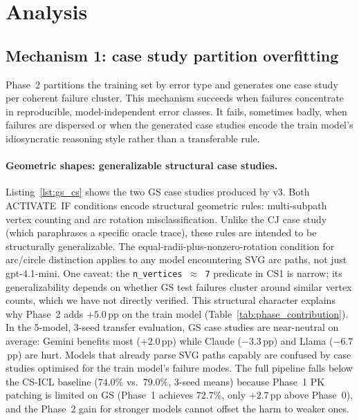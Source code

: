 \documentclass{article}
\begin{document}


\section{Analysis}
\label{sec:analysis}

\subsection{Mechanism 1: case study partition overfitting}
\label{sec:overfitting}

Phase~2 partitions the training set by error type and generates one case study per coherent
failure cluster.
This mechanism succeeds when failures concentrate in reproducible, model-independent error classes.
It fails, sometimes badly, when failures are dispersed or when the generated case studies encode
the train model's idiosyncratic reasoning style rather than a transferable rule.

\paragraph{Geometric shapes: generalizable structural case studies.}
Listing~\ref{lst:gs_cs} shows the two GS case studies produced by v3.
Both ACTIVATE~IF conditions encode structural geometric rules: multi-subpath vertex counting
and arc rotation misclassification.
Unlike the CJ case study (which paraphrases a specific oracle trace), these rules are
intended to be structurally generalizable. The equal-radii-plus-nonzero-rotation condition
for arc/circle distinction applies to any model encountering SVG arc paths, not just gpt-4.1-mini.
One caveat: the \texttt{n\_vertices $\approx$ 7} predicate in CS1 is narrow;
its generalizability depends on whether GS test failures cluster around similar vertex counts,
which we have not directly verified.
This structural character explains why Phase~2 adds $+5.0$\,pp on the train model
(Table~\ref{tab:phase_contribution}).
In the 5-model, 3-seed transfer evaluation, GS case studies are near-neutral on average:
Gemini benefits most ($+2.0$\,pp) while Claude ($-3.3$\,pp) and Llama ($-6.7$\,pp) are
hurt. Models that already parse SVG paths capably are confused by case studies optimised
for the train model's failure modes.
The full pipeline falls below the CS-ICL baseline ($74.0\%$ vs.\ $79.0\%$, 3-seed means)
because Phase~1 PK patching is limited on GS (Phase~1 achieves $72.7\%$, only $+2.7$\,pp
above Phase~0), and the Phase~2 gain for stronger models cannot offset the harm to weaker ones.
\end{document}
